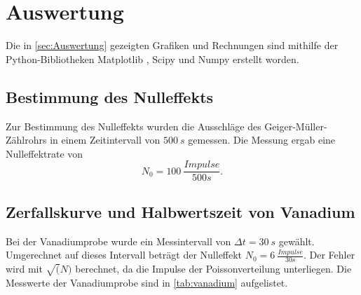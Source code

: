 \section{Auswertung}
\label{sec:Auswertung}
Die in \autoref{sec:Auswertung} gezeigten Grafiken und Rechnungen sind mithilfe der Python-Bibliotheken Matplotlib \cite{matplotlib}, Scipy \cite{scipy} und Numpy \cite{numpy}
erstellt worden.
\subsection{Bestimmung des Nulleffekts}\label{sec:Nulleffekt}
Zur Bestimmung des Nulleffekts wurden die Ausschläge des Geiger-Müller-Zählrohrs in einem 
Zeitintervall von $\SI{500}{s}$ gemessen.
Die Messung ergab eine Nulleffektrate von
\begin{equation*}
  N_{0} = \SI{100}{\frac{Impulse}{500s}}.
\end{equation*}

\subsection{Zerfallskurve und Halbwertszeit von Vanadium}
Bei der Vanadiumprobe wurde ein Messintervall von $\Delta t = \SI{30}{s}$ gewählt. Umgerechnet auf dieses
Intervall beträgt der Nulleffekt $N_0 = \SI{6}{\frac{Impulse}{30s}}$. Der Fehler wird mit 
$\sqrt(N)$ berechnet, da die Impulse der Poissonverteilung unterliegen. Die Messwerte der Vanadiumprobe
sind in \autoref{tab:vanadium} aufgelistet.

